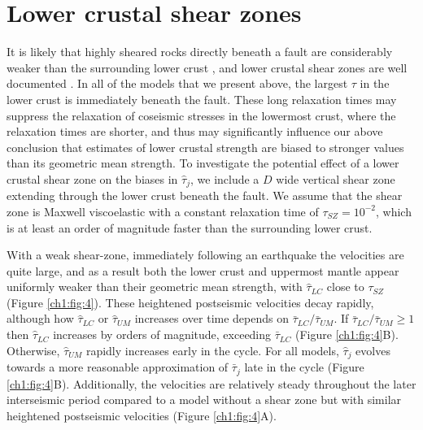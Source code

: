 \section{Lower crustal shear zones}
It is likely that highly sheared rocks directly beneath a fault are
considerably weaker than the surrounding lower crust
\citep[e.g.,][]{Montesi2003}, and lower crustal shear zones are well
documented \citep[e.g.,][]{Vauchez2003}. In all of the models that we
present above, the largest $\tau$ in the lower crust is immediately
beneath the fault.  These long relaxation times may suppress the
relaxation of coseismic stresses in the lowermost crust, where the
relaxation times are shorter, and thus may significantly influence our
above conclusion that estimates of lower crustal strength are biased
to stronger values than its geometric mean strength. To investigate
the potential effect of a lower crustal shear zone on the biases in
$\hat{\tau}_j$, we include a $D$ wide vertical shear zone extending
through the lower crust beneath the fault.  We assume that the shear
zone is Maxwell viscoelastic with a constant relaxation time of
$\tau_{SZ} = 10^{-2}$, which is at least an order of magnitude faster
than the surrounding lower crust.

With a weak shear-zone, immediately following an earthquake the
velocities are quite large, and as a result both the lower crust and
uppermost mantle appear uniformly weaker than their geometric mean
strength, with $\hat{\tau}_{LC}$ close to $\tau_{SZ}$ (Figure
\ref{ch1:fig:4}). These heightened postseismic velocities decay
rapidly, although how $\hat{\tau}_{LC}$ or $\hat{\tau}_{UM}$ increases
over time depends on $\bar{\tau}_{LC}/\bar{\tau}_{UM}$. If
$\bar{\tau}_{LC}/\bar{\tau}_{UM} \geq 1$ then $\hat{\tau}_{LC}$ increases
by orders of magnitude, exceeding $\bar{\tau}_{LC}$ (Figure
\ref{ch1:fig:4}B). Otherwise, $\hat{\tau}_{UM}$ rapidly increases
early in the cycle. For all models, $\hat{\tau}_j$ evolves towards a
more reasonable approximation of $\bar{\tau}_j$ late in the cycle
(Figure \ref{ch1:fig:4}B). Additionally, the velocities are relatively
steady throughout the later interseismic period compared to a model
without a shear zone but with similar heightened postseismic
velocities (Figure \ref{ch1:fig:4}A).


